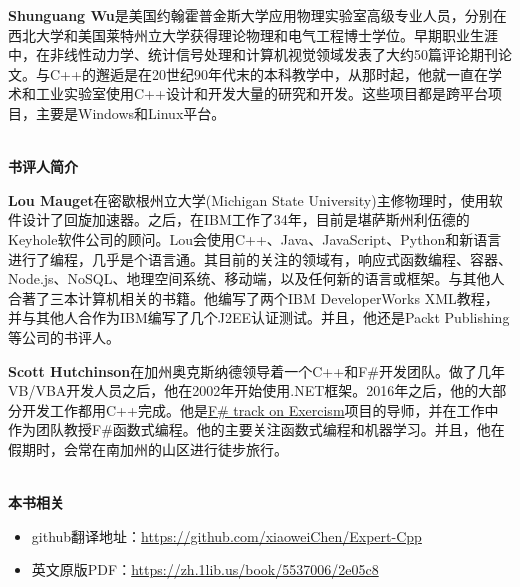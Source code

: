 \documentclass[11pt,a4paper,UTF8]{ctexart}
\begin{document}
	\textbf{Shunguang Wu}是美国约翰霍普金斯大学应用物理实验室高级专业人员，分别在西北大学和美国莱特州立大学获得理论物理和电气工程博士学位。早期职业生涯中，在非线性动力学、统计信号处理和计算机视觉领域发表了大约50篇评论期刊论文。与C++的邂逅是在20世纪90年代末的本科教学中，从那时起，他就一直在学术和工业实验室使用C++设计和开发大量的研究和开发。这些项目都是跨平台项目，主要是Windows和Linux平台。\par
	
	\hspace*{\fill} \\ %
	\noindent\textbf{书评人简介}\ \par
	\textbf{Lou Mauget}在密歇根州立大学(Michigan State University)主修物理时，使用软件设计了回旋加速器。之后，在IBM工作了34年，目前是堪萨斯州利伍德的Keyhole软件公司的顾问。Lou会使用C++、Java、JavaScript、Python和新语言进行了编程，几乎是个语言通。其目前的关注的领域有，响应式函数编程、容器、Node.js、NoSQL、地理空间系统、移动端，以及任何新的语言或框架。与其他人合著了三本计算机相关的书籍。他编写了两个IBM DeveloperWorks XML教程，并与其他人合作为IBM编写了几个J2EE认证测试。并且，他还是Packt Publishing等公司的书评人。 \par
	
	\textbf{Scott Hutchinson}在加州奥克斯纳德领导着一个C++和F\#开发团队。做了几年VB/VBA开发人员之后，他在2002年开始使用.NET框架。2016年之后，他的大部分开发工作都用C++完成。他是\href{https://github.com/exercism/fsharp}{F\# track on Exercism}项目的导师，并在工作中作为团队教授F\#函数式编程。他的主要关注函数式编程和机器学习。并且，他在假期时，会常在南加州的山区进行徒步旅行。 \par
	
	\hspace*{\fill} \\ %
	\noindent\textbf{本书相关}\ \par
	\begin{itemize}
		\item github翻译地址：\href{https://github.com/xiaoweiChen/Expert-Cpp}{https://github.com/xiaoweiChen/Expert-Cpp}
		\item 英文原版PDF：\href{https://zh.1lib.us/book/5537006/2e05c8}{https://zh.1lib.us/book/5537006/2e05c8}
	\end{itemize}
	\newpage
	
	\tableofcontents
	\newpage
	
	\pagestyle{empty}
	
	\newpage
	
	\pagestyle{empty}
	
	\newpage
	
\end{document}
